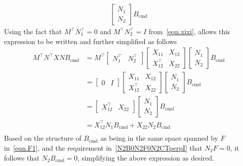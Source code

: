 \begin{proof-dan}
\begin{equation*}
\begin{split}
\begin{bmatrix}
        N_{1} \\
        N_{2}
      \end{bmatrix}
      B_{\text{cmd}}
    \end{split}
  \end{equation*}
  Using the fact that $M^{\top}N_{1}^{\top}=0$ and $M^{\top}N_{2}^{\top}=I$ from\ \eqref{eqn.xixi}, allows this expression to be written and further simplified as follows
  \begin{equation*}
    \begin{split}
      M^{\top}N^{\top}XNB_{\text{cmd}}
      &=
      M^{\top}
      \begin{bmatrix}
        N_{1}^{\top} & N_{2}^{\top}
      \end{bmatrix}
      \begin{bmatrix}
        X_{11} & X_{12} \\
        X_{12}^{\top} & X_{22}
      \end{bmatrix}
      \begin{bmatrix}
        N_{1} \\
        N_{2}
      \end{bmatrix}
      B_{\text{cmd}} \\
      &=
      \begin{bmatrix}
        0 & I
      \end{bmatrix}
      \begin{bmatrix}
        X_{11} & X_{12} \\
        X_{12}^{\top} & X_{22}
      \end{bmatrix}
      \begin{bmatrix}
        N_{1} \\
        N_{2}
      \end{bmatrix}
      B_{\text{cmd}} \\
      &=
      \begin{bmatrix}
        X_{12}^{\top} & X_{22}
      \end{bmatrix}
      \begin{bmatrix}
        N_{1} \\
        N_{2}
      \end{bmatrix}
      B_{\text{cmd}} \\
      &= X_{12}^{\top}N_{1}B_{\text{cmd}} + X_{22}N_{2}B_{\text{cmd}} \\
    \end{split}
  \end{equation*}
  Based on the structure of $B_{\text{cmd}}$ as being in the same space spanned by $F$ in\ \eqref{eqn.F1}, and the requirement in\ \eqref{N2B0N2F0N2CTperpI} that $N_{2}F=0$, it follows that $N_{2}B_{\text{cmd}}=0$, simplifying the above expression as desired.
\end{proof-dan}

